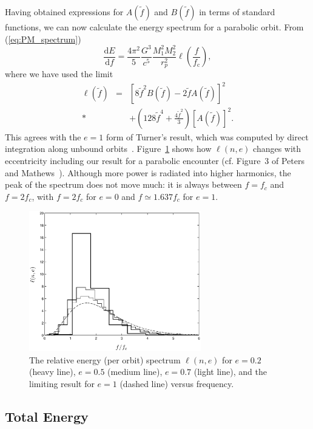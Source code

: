 \documentclass[aps,prd,amsfonts,amssymb,amsmath,nofootinbib,floatfix,reprint,showpacs,groupedaddress]{revtex4-1}
\newcommand{\eqnref}[1]{(\ref{eq:#1})}
\newcommand{\Figref}[1]{Figure~\ref{fig:#1}}
\newcommand{\sub}[1]{\ensuremath{_\text{#1}}}
\newcommand{\dd}{\ensuremath{\mathrm{d}}}
\newcommand{\diff}[2]{\ensuremath{\frac{\dd {#1}}{\dd {#2}}}}
\begin{document}
Having obtained expressions for $A(\tilde{f})$ and $B(\tilde{f})$ in terms of standard functions, we can now calculate the energy spectrum for a parabolic orbit. From \eqnref{PM_spectrum}
\begin{equation}
\diff{E}{f} = \frac{4\pi^2}{5}\frac{G^3}{c^5}\frac{M_1^2M_2^2}{r_{p}^2}\ell\left(\frac{f}{f\sub{c}}\right),
\label{eq:PM_dEdf}
\end{equation}
where we have used the limit
\begin{eqnarray}
\ell(\tilde{f}) & = & \left[8\tilde{f}^2B(\tilde{f}) - 2\tilde{f}A(\tilde{f})\right]^2 \nonumber \\*
 & & + \left(128\tilde{f}^4 + \frac{4\tilde{f}^2}{3}\right)\left[A(\tilde{f})\right]^2.
\end{eqnarray}
This agrees with the $e =1$ form of Turner's result, which was computed by direct integration along unbound orbits~\cite{Turner1977}. \Figref{ell} shows how $\ell(n,e)$ changes with eccentricity including our result for a parabolic encounter (cf. Figure~3 of Peters and Mathews~\cite{Peters1963}). Although more power is radiated into higher harmonics, the peak of the spectrum does not move much: it is always between $f = f_{c}$ and $f = 2 f_{c}$, with $f = 2 f_{c}$ for $e = 0$ and $f \simeq 1.637 f_{c}$ for $e = 1$.
\begin{figure}
\includegraphics[width=75mm]{ell_1.eps}
\caption{The relative energy (per orbit) spectrum $\ell(n,e)$ for $e = 0.2$ (heavy line), $e = 0.5$ (medium line), $e = 0.7$ (light line), and the limiting result for $e = 1$ (dashed line) versus frequency.\label{fig:ell}}
\end{figure}

\subsection{Total Energy}
\end{document}
